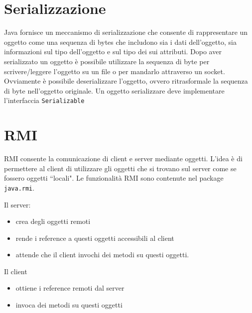 \documentclass{article}
\begin{document}
\maketitle



\newpage
\tableofcontents
\newpage



\section{Serializzazione}
Java fornisce un meccanismo di serializzazione che consente di rappresentare un oggetto come una sequenza di bytes che includono sia i dati dell'oggetto, sia informazioni sul tipo dell'oggetto e sul tipo dei sui attributi. Dopo aver serializzato un oggetto \`e possibile utilizzare la sequenza di byte per scrivere/leggere l'oggetto su un file o per mandarlo attraverso un socket. Ovviamente \`e possibile deserializzare l'oggetto, ovvero ritrasformale la sequenza di byte nell'oggetto originale. Un oggetto serializzare deve implementare l'interfaccia \texttt{Serializable}


\section{RMI}
RMI consente la comunicazione di client e server mediante oggetti. L'idea \`e di permettere al client di utilizzare gli oggetti che si trovano sul server come se fossero oggetti ``locali". Le funzionalit\`a RMI sono contenute nel package \texttt{java.rmi}.

Il server:
\begin{itemize}
\item crea degli oggetti remoti
\item rende i reference a questi oggetti accessibili al client
\item attende che il client invochi dei metodi su questi oggetti.
\end{itemize}

Il client
\begin{itemize}
\item ottiene i reference remoti dal server
\item invoca dei metodi su questi oggetti
\end{itemize}
\end{document}

